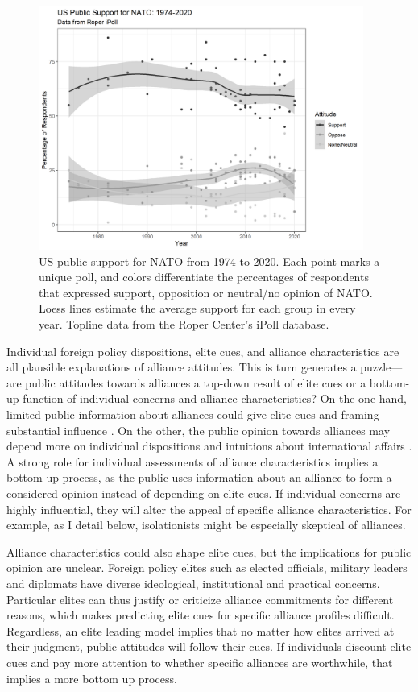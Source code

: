 \documentclass[12pt]{article}
\begin{document}
\begin{figure}
	\centering
		\includegraphics[width=0.95\textwidth]{../figures/nato-op-time.png}
	\caption{US public support for NATO from 1974 to 2020. Each point marks a unique poll, and colors differentiate the percentages of respondents that expressed support, opposition or neutral/no opinion of NATO. Loess lines estimate the average support for each group in every year. Topline data from the Roper Center's iPoll database.}
	\label{fig:nato-op-time}
\end{figure}


Individual foreign policy dispositions, elite cues, and alliance characteristics are all plausible explanations of alliance attitudes.
This is turn generates a puzzle--- are public attitudes towards alliances a top-down result of elite cues or a bottom-up function of individual concerns and alliance characteristics? 
On the one hand, limited public information about alliances could give elite cues and framing substantial influence \citep{Druckman2001}. 
On the other, the public opinion towards alliances may depend more on individual dispositions and intuitions about international affairs \citep{KertzerZeitzoff2017}.
A strong role for individual assessments of alliance characteristics implies a bottom up process, as the public uses information about an alliance to form a considered opinion instead of depending on elite cues.
If individual concerns are highly influential, they will alter the appeal of specific alliance characteristics. 
For example, as I detail below, isolationists might be especially skeptical of alliances.  


Alliance characteristics could also shape elite cues, but the implications for public opinion are unclear. 
Foreign policy elites such as elected officials, military leaders and diplomats have diverse ideological, institutional and practical concerns. 
Particular elites can thus justify or criticize alliance commitments for different reasons, which makes predicting elite cues for specific alliance profiles difficult. 
Regardless, an elite leading model implies that no matter how elites arrived at their judgment, public attitudes will follow their cues. 
If individuals discount elite cues and pay more attention to whether specific alliances are worthwhile, that implies a more bottom up process. 
\end{document}
